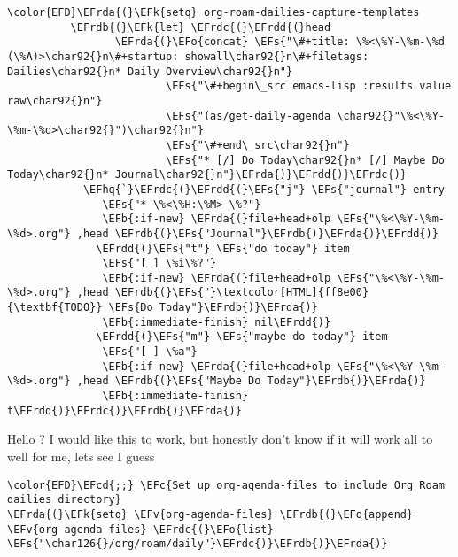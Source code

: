 \documentclass{article}
\newcommand{\EFc}[1]{\textcolor{EFc}{#1}} %
\newcommand{\EFcd}[1]{\textcolor{EFcd}{#1}} %
\newcommand{\EFs}[1]{\textcolor{EFs}{#1}} %
\newcommand{\EFk}[1]{\textcolor{EFk}{#1}} %
\newcommand{\EFb}[1]{\textcolor{EFb}{#1}} %
\newcommand{\EFv}[1]{\textcolor{EFv}{#1}} %
\newcommand{\EFo}[1]{\textcolor{EFo}{#1}} %
\newcommand{\EFhq}[1]{#1} %
\newcommand{\EFrda}[1]{\textcolor{EFrda}{#1}} %
\newcommand{\EFrdb}[1]{\textcolor{EFrdb}{#1}} %
\newcommand{\EFrdc}[1]{\textcolor{EFrdc}{#1}} %
\newcommand{\EFrdd}[1]{\textcolor{EFrdd}{#1}} %
\begin{document}
\begin{Code}
\begin{Verbatim}
\color{EFD}\EFrda{(}\EFk{setq} org-roam-dailies-capture-templates
          \EFrdb{(}\EFk{let} \EFrdc{(}\EFrdd{(}head
                 \EFrda{(}\EFo{concat} \EFs{"\#+title: \%<\%Y-\%m-\%d (\%A)>\char92{}n\#+startup: showall\char92{}n\#+filetags: Dailies\char92{}n* Daily Overview\char92{}n"}
                         \EFs{"\#+begin\_src emacs-lisp :results value raw\char92{}n"}
                         \EFs{"(as/get-daily-agenda \char92{}"\%<\%Y-\%m-\%d>\char92{}")\char92{}n"}
                         \EFs{"\#+end\_src\char92{}n"}
                         \EFs{"* [/] Do Today\char92{}n* [/] Maybe Do Today\char92{}n* Journal\char92{}n"}\EFrda{)}\EFrdd{)}\EFrdc{)}
            \EFhq{`}\EFrdc{(}\EFrdd{(}\EFs{"j"} \EFs{"journal"} entry
               \EFs{"* \%<\%H:\%M> \%?"}
               \EFb{:if-new} \EFrda{(}file+head+olp \EFs{"\%<\%Y-\%m-\%d>.org"} ,head \EFrdb{(}\EFs{"Journal"}\EFrdb{)}\EFrda{)}\EFrdd{)}
              \EFrdd{(}\EFs{"t"} \EFs{"do today"} item
               \EFs{"[ ] \%i\%?"}
               \EFb{:if-new} \EFrda{(}file+head+olp \EFs{"\%<\%Y-\%m-\%d>.org"} ,head \EFrdb{(}\EFs{"}\textcolor[HTML]{ff8e00}{\textbf{TODO}} \EFs{Do Today"}\EFrdb{)}\EFrda{)}
               \EFb{:immediate-finish} nil\EFrdd{)}
              \EFrdd{(}\EFs{"m"} \EFs{"maybe do today"} item
               \EFs{"[ ] \%a"}
               \EFb{:if-new} \EFrda{(}file+head+olp \EFs{"\%<\%Y-\%m-\%d>.org"} ,head \EFrdb{(}\EFs{"Maybe Do Today"}\EFrdb{)}\EFrda{)}
               \EFb{:immediate-finish} t\EFrdd{)}\EFrdc{)}\EFrdb{)}\EFrda{)}
\end{Verbatim}
\end{Code}

Hello
? I would like this to work, but honestly don't know if it will work all to well for me, lets see I guess
\begin{Code}
\begin{Verbatim}
\color{EFD}\EFcd{;;} \EFc{Set up org-agenda-files to include Org Roam dailies directory}
\EFrda{(}\EFk{setq} \EFv{org-agenda-files} \EFrdb{(}\EFo{append} \EFv{org-agenda-files} \EFrdc{(}\EFo{list} \EFs{"\char126{}/org/roam/daily"}\EFrdc{)}\EFrdb{)}\EFrda{)}

\end{Verbatim}
\end{Code}
\end{document}
